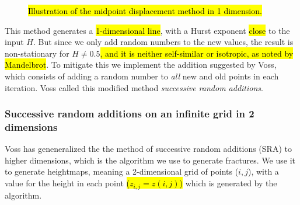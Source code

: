 \begin{figure}
    \centering
    
    \caption{
        \hl{Illustration of the midpoint displacement method in 1 dimension.}
        \label{fig:midpoint01}
    }
\end{figure}

This method generates a \hl{1-dimensional line}, with a Hurst exponent \hl{close} to the input $H$. But since we only add random numbers to the new values, the result is non-stationary for $H \neq 0.5$\cite{voss1985random}\hl{, and it is neither self-similar or isotropic, as noted by Mandelbrot}\cite{mandelbrot1982comment}. To mitigate this we implement the addition suggested by Voss\cite{voss1985random}, which consists of adding a random number to \emph{all} new and old points in each iteration. Voss called this modified method \emph{successive random additions}.

\subsubsection{Successive random additions on an infinite grid in 2 dimensions}

%     

Voss has geneneralized the the method of successive random additions (SRA) to higher dimensions\cite{voss1985random}, which is the algorithm we use to generate fractures. We use it to generate heightmaps, meaning a 2-dimensional grid of points ({$i,j$}), with a value for the height in each point \hl{($z_{i,j} = z(i,j)$)} which is generated by the algorithm.



